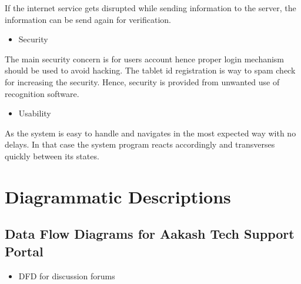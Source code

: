 \documentclass[letterpaper,10pt,english]{sphinxmanual}
\begin{document}
If the internet service gets disrupted while sending information to the server, the information can be send again for verification.
\begin{itemize}
\item {} 
Security

\end{itemize}

The main security concern is for users account hence proper login mechanism should be used to avoid hacking. The tablet id registration is way to spam check for increasing the security. Hence, security is provided from unwanted use of recognition software.
\begin{itemize}
\item {} 
Usability

\end{itemize}

As the system is easy to handle and navigates in the most expected way with no delays. In that case the system program reacts accordingly and transverses quickly between its states.


\chapter{Diagrammatic Descriptions}
\label{unifieddoc:diagrammatic-descriptions}

\section{Data Flow Diagrams for Aakash Tech Support Portal}
\label{unifieddoc:data-flow-diagrams-for-aakash-tech-support-portal}\begin{itemize}
\item {} 
DFD for discussion forums

\end{itemize}
\begin{figure}[htbp]
\centering

\end{figure}
\end{document}

